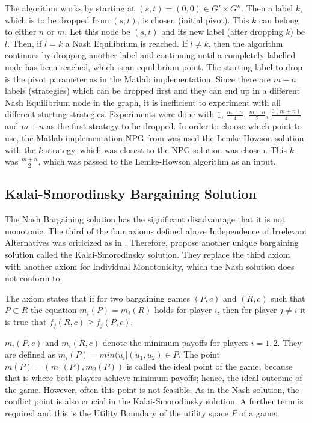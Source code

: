The algorithm works by starting at $(s,t) = (0,0) \in G' \times G'' $. Then a label $k$, which is to be dropped from $(s,t)$, is chosen (initial pivot). This $k$ can belong to either $n$ or $m$. Let this node be $(s,t)$ and its new label (after dropping $k$) be $l$. Then, if $l=k$ a Nash Equilibrium is reached. If $l\neq k$, then the algorithm continues by dropping another label and continuing until a completely labelled node has been reached, which is an equilibrium point. The starting label to drop is the pivot parameter as in the Matlab implementation. Since there are $m+n$ labels (strategies) which can be dropped first and they can end up in a different Nash Equilibrium node in the graph, it is inefficient to experiment with all different starting strategies. Experiments were done with $1$, $\frac{m+n}{4}$, $\frac{m+n}{2}$, $\frac{3(m+n)}{4}$ and $m+n$ as the first strategy to be dropped. In order to choose which point to use, the Matlab implementation NPG from \citet{npg} was used the Lemke-Howson solution with the $k$ strategy, which was closest to the NPG solution was chosen. This $k$ was $\frac{m+n}{2}$, which was passed to the Lemke-Howson algorithm as an input.

\subsection{Kalai-Smorodinsky Bargaining Solution}
The Nash Bargaining solution has the significant disadvantage that it is not monotonic. The third of the four axioms defined above Independence of Irrelevant Alternatives was criticized as in \citet{kalai1975other}. Therefore, \citet{kalai1975other} propose another unique bargaining solution called the Kalai-Smorodinsky solution. They replace the third axiom with another axiom for Individual Monotonicity, which the Nash solution does not conform to. 

The axiom states that if for two bargaining games $(P,c)$ and $(R,c)$ such that $P \subset R$ the equation $m_i(P) = m_i(R)$ holds for player $i$, then for player $j \neq i$ it is true that $f_j(R,c) \geq f_j(P,c)$.

$m_i(P,c)$ and $m_i(R,c)$ denote the minimum payoffs for players $i = 1,2$. They are defined as $m_i(P) = min(u_i | (u_1,u_2) \in P$. The point $m(P) = (m_1(P),m_2(P))$ is called the ideal point of the game, because that is where both players achieve minimum payoffs; hence, the ideal outcome of the game. However, often this point is not feasible. As in the Nash solution, the conflict point is also crucial in the Kalai-Smorodinsky solution. A further term is required and this is the Utility Boundary of the utility space $P$ of a game:


